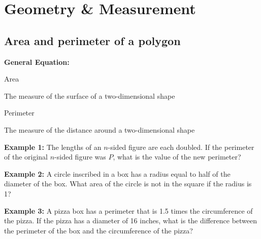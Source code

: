 \chapter{Geometry \& Measurement}

\section{Area and perimeter of a polygon}
\textbf{General Equation:}

\begin{center}
\begin{multicols}{2}
Area

The measure of the surface of a two-dimensional shape

Perimeter

The measure of the distance around a two-dimensional shape
\end{multicols}
\end{center}

\vfill\textbf{Example 1:} The lengths of an $n$-sided figure are each doubled. If the perimeter of the original $n$-sided figure was $P$, what is the value of the new perimeter?

\vfill\textbf{Example 2:} A circle inscribed in a box has a radius equal to half of the diameter of the box. What area of the circle is not in the square if the radius is 1?

\vfill\textbf{Example 3:} A pizza box has a perimeter that is 1.5 times the circumference of the pizza. If the pizza has a diameter of 16 inches, what is the difference between the perimeter of the box and the circumference of the pizza?

